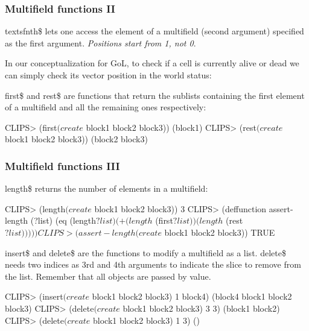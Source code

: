 \documentclass[xcolor={usenames,dvipsnames,svgnames}, compress]{beamer}
\begin{document}

\begin{frame}[fragile]
  \frametitle{Multifield functions II}
  textsf{nth\$} lets one access the element of a multifield (second
  argument) specified as the first argument. 
  \emph{Positions start from 1, not 0}.\par
    In our conceptualization for GoL, to check if a cell is currently
    alive or dead we can simply check its vector position in the world status:
    \bigskip

    \textsf{first\$} and \textsf{rest\$} are functions that return the
    sublists containing the first element of a multifield and all the
    remaining ones respectively:
    \begin{clips-code}
      CLIPS> (first$ (create$ block1 block2 block3))
      (block1)
      CLIPS> (rest$ (create$ block1 block2 block3))
      (block2 block3)
    \end{clips-code}
\end{frame}


\begin{frame}[fragile]
  \frametitle{Multifield functions III}
  \textsf{length\$} returns the number of elements in a multifield:
  \begin{clips-code}
    CLIPS> (length$ (create$ block1 block2 block3))
    3
    CLIPS> (deffunction assert-length (?list)
    (eq (length$ ?list) (+ (length$ (first$ ?list)) (length$ (rest$ ?list)))))
    CLIPS> (assert-length (create$ block1 block2 block3))
    TRUE
  \end{clips-code}\bigskip

    \textsf{insert\$} and \textsf{delete\$} are the functions to modify
    a multifield as a list. \textsf{delete\$} needs two indices as 3rd
    and 4th arguments to indicate the slice to remove from the list. Remember that all
    objects are passed by value.
    \begin{clips-code}
      CLIPS> (insert$ (create$ block1 block2 block3) 1 block4)
      (block4 block1 block2 block3)
      CLIPS> (delete$ (create$ block1 block2 block3) 3 3)
      (block1 block2)
      CLIPS> (delete$ (create$ block1 block2 block3) 1 3)
      ()
    \end{clips-code}
\end{frame}
\end{document}
